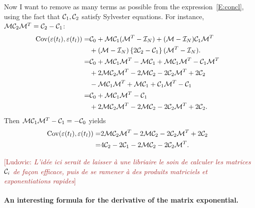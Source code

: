 \documentclass{article}
\renewcommand{\L}[1]{{\textcolor{Brown}{[Ludovic: \textit{#1}]}}}
\begin{document}
Now I want to remove as many terms as possible from the expression~\eqref{E:concl}, using the fact that ${\mathcal C}_1,{\mathcal C}_2$ satisfy Sylvester equations. For instance, ${\mathcal M}{\mathcal C}_2{\mathcal M}^T={\mathcal C}_2-{\mathcal C}_1$:
\begin{equation}
    \begin{aligned}
    \mathrm{Cov}(\varepsilon(t_l),\varepsilon(t_{l}))
    =&
    {\mathcal C}_0+{\mathcal M}{\mathcal C}_{1}({\mathcal M}^T-{\mathcal I}_N)
    +
    ({\mathcal M}-{\mathcal I}_N){\mathcal C}_{1}{\mathcal M}^T
    \\
    &+
    ({\mathcal M}-{\mathcal I}_N)
    \left\{
        2 {\mathcal C}_2 -{\mathcal C}_1
    \right\}
    ({\mathcal M}^T-{\mathcal I}_N).
    \\
    =&
    {\mathcal C}_0+{\mathcal M}{\mathcal C}_{1}{\mathcal M}^T-{\mathcal M}{\mathcal C}_{1}+{\mathcal M}{\mathcal C}_{1}{\mathcal M}^T-{\mathcal C}_{1}{\mathcal M}^T
    \\
    &+
    2{\mathcal M}
        {\mathcal C}_2
    {\mathcal M}^T
    -
    2{\mathcal M}
        {\mathcal C}_2
    -
    2{\mathcal C}_2
    {\mathcal M}^T
    +
    2{\mathcal C}_2
    \\
    &
    -
    {\mathcal M}
       {\mathcal C}_1
    {\mathcal M}^T
    +{\mathcal M}
       {\mathcal C}_1
    +
       {\mathcal C}_1
    {\mathcal M}^T
    -
       {\mathcal C}_1
    \\
    =&
    {\mathcal C}_0+{\mathcal M}{\mathcal C}_{1}{\mathcal M}^T-{\mathcal C}_1
    \\
    &+
    2{\mathcal M}
        {\mathcal C}_2
    {\mathcal M}^T
    -
    2{\mathcal M}
        {\mathcal C}_2
    -
    2{\mathcal C}_2
    {\mathcal M}^T
    +
    2{\mathcal C}_2.
    \end{aligned}
\end{equation}
Then ${\mathcal M}{\mathcal C}_{1}{\mathcal M}^T-{\mathcal C}_1=-{\mathcal C}_0$ yields 
\begin{equation}
    \begin{aligned}
    \mathrm{Cov}(\varepsilon(t_l),\varepsilon(t_{l}))
    =&
    2{\mathcal M}
        {\mathcal C}_2
    {\mathcal M}^T
    -
    2{\mathcal M}
        {\mathcal C}_2
    -
    2{\mathcal C}_2
    {\mathcal M}^T
    +
    2{\mathcal C}_2
    \\
    =&
    4{\mathcal C}_2-2{\mathcal C}_1-2{\mathcal M}{\mathcal C}_2-2{\mathcal C}_2
    {\mathcal M}^T.
    \end{aligned}
\end{equation}

\L{L'idée ici serait de laisser à une libriaire le soin de calculer les matrices ${\mathcal C}_i$ de façon efficace, puis de se ramener à des produits matriciels et exponentiations rapides}

\paragraph{An interesting formula for the derivative of the matrix exponential.}
\end{document}
